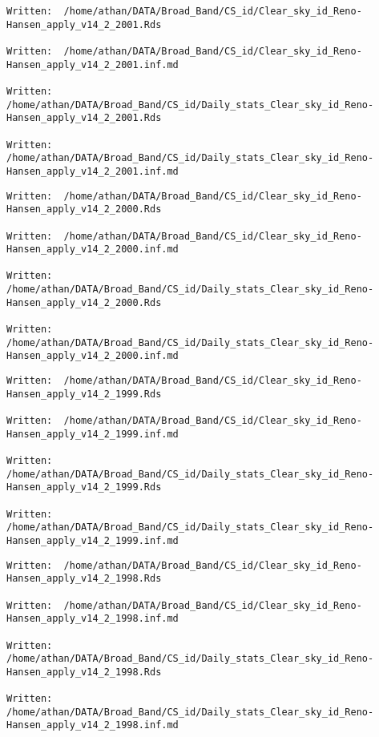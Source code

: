 \documentclass[
  10pt,
  a4paper,oneside]{article}
\begin{document}
\begin{verbatim}
Written:  /home/athan/DATA/Broad_Band/CS_id/Clear_sky_id_Reno-Hansen_apply_v14_2_2001.Rds 

Written:  /home/athan/DATA/Broad_Band/CS_id/Clear_sky_id_Reno-Hansen_apply_v14_2_2001.inf.md 

Written:  /home/athan/DATA/Broad_Band/CS_id/Daily_stats_Clear_sky_id_Reno-Hansen_apply_v14_2_2001.Rds 

Written:  /home/athan/DATA/Broad_Band/CS_id/Daily_stats_Clear_sky_id_Reno-Hansen_apply_v14_2_2001.inf.md 
\end{verbatim}

\begin{verbatim}
Written:  /home/athan/DATA/Broad_Band/CS_id/Clear_sky_id_Reno-Hansen_apply_v14_2_2000.Rds 

Written:  /home/athan/DATA/Broad_Band/CS_id/Clear_sky_id_Reno-Hansen_apply_v14_2_2000.inf.md 

Written:  /home/athan/DATA/Broad_Band/CS_id/Daily_stats_Clear_sky_id_Reno-Hansen_apply_v14_2_2000.Rds 

Written:  /home/athan/DATA/Broad_Band/CS_id/Daily_stats_Clear_sky_id_Reno-Hansen_apply_v14_2_2000.inf.md 
\end{verbatim}

\begin{verbatim}
Written:  /home/athan/DATA/Broad_Band/CS_id/Clear_sky_id_Reno-Hansen_apply_v14_2_1999.Rds 

Written:  /home/athan/DATA/Broad_Band/CS_id/Clear_sky_id_Reno-Hansen_apply_v14_2_1999.inf.md 

Written:  /home/athan/DATA/Broad_Band/CS_id/Daily_stats_Clear_sky_id_Reno-Hansen_apply_v14_2_1999.Rds 

Written:  /home/athan/DATA/Broad_Band/CS_id/Daily_stats_Clear_sky_id_Reno-Hansen_apply_v14_2_1999.inf.md 
\end{verbatim}

\begin{verbatim}
Written:  /home/athan/DATA/Broad_Band/CS_id/Clear_sky_id_Reno-Hansen_apply_v14_2_1998.Rds 

Written:  /home/athan/DATA/Broad_Band/CS_id/Clear_sky_id_Reno-Hansen_apply_v14_2_1998.inf.md 

Written:  /home/athan/DATA/Broad_Band/CS_id/Daily_stats_Clear_sky_id_Reno-Hansen_apply_v14_2_1998.Rds 

Written:  /home/athan/DATA/Broad_Band/CS_id/Daily_stats_Clear_sky_id_Reno-Hansen_apply_v14_2_1998.inf.md 
\end{verbatim}
\end{document}
